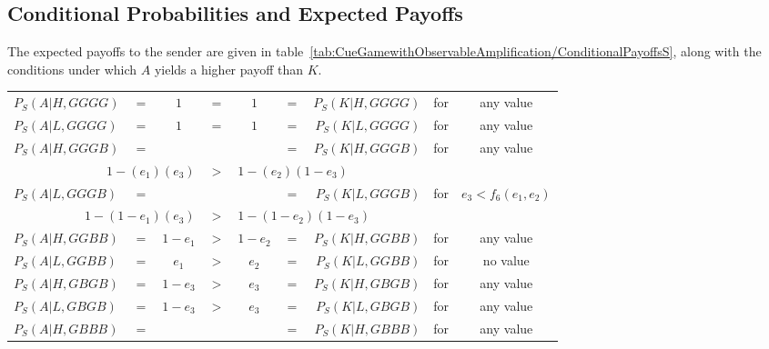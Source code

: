 \documentclass[a4paper,12pt]{article}
\numberwithin{equation}{section}
\begin{document}
\subsection{Conditional Probabilities and Expected Payoffs}
\label{sec:Cue Game with Observable Amplification/Conditional Payoffs}

The expected payoffs to the sender are given in table~\ref{tab:CueGamewithObservableAmplification/ConditionalPayoffsS}, along with the conditions under which $A$ yields a higher payoff than $K$.

\begin{table}[h]
\begin{center}
\setlength{\tabcolsep}{.45em}
\begin{tabular}{lcccccrcc}
$P_{S}(A|H,GGGG)$ & $=$ & $1$ & $=$ & $1$ & = & $P_{S}(K|H,GGGG)$ & for & any value\\
$P_{S}(A|L,GGGG)$ & $=$ & $1$ & $=$ & $1$ & = & $P_{S}(K|L,GGGG)$ & for & any value\\
$P_{S}(A|H,GGGB)$ & $=$ & \hspace{10mm} & & \hspace{10mm} & $=$ & $P_{S}(K|H,GGGB)$ & \multirow{2}{*}{for} & \multirow{2}{*}{ any value}
\vspace{-1mm}\\
\multicolumn{3}{r}{$1-(e_{1})(e_{3})$} & $>$ & \multicolumn{3}{l}{$1-(e_{2})(1-e_{3})$} &
\vspace{1mm}\\
$P_{S}(A|L,GGGB)$ & $=$ & & & & $=$ & $P_{S}(K|L,GGGB)$ & \multirow{2}{*}{for} & \multirow{2}{*}{$e_{3}<f_{6}(e_{1},e_{2})$}
\vspace{-1mm}\\
\multicolumn{3}{r}{$1-(1-e_{1})(e_{3})$} & $>$ & \multicolumn{3}{l}{$1-(1-e_{2})(1-e_{3})$} &
\vspace{1mm}\\
$P_{S}(A|H,GGBB)$ & $=$ & $1-e_{1}$ & $>$ & $1-e_{2}$ & = & $P_{S}(K|H,GGBB)$ & for & any value\\
$P_{S}(A|L,GGBB)$ & $=$ & $e_{1}$ & $>$ & $e_{2}$ & = & $P_{S}(K|L,GGBB)$ & for & no value\\
$P_{S}(A|H,GBGB)$ & $=$ & $1-e_{3}$ & $>$ & $e_{3}$ & = & $P_{S}(K|H,GBGB)$ & for & any value\\
$P_{S}(A|L,GBGB)$ & $=$ & $1-e_{3}$ & $>$ & $e_{3}$ & = & $P_{S}(K|L,GBGB)$ & for & any value\\
$P_{S}(A|H,GBBB)$ & $=$ & & & & $=$ & $P_{S}(K|H,GBBB)$ & \multirow{2}{*}{for} & \multirow{2}{*}{ any value}
\vspace{-1mm}\\

\end{tabular}
\end{center}
\end{table}
\end{document}
